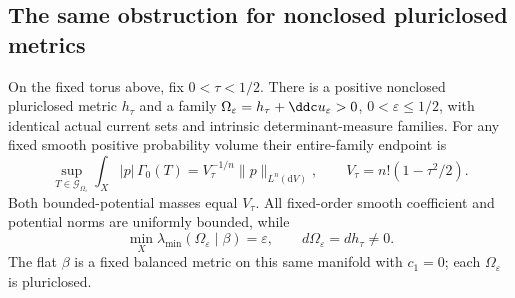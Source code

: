 \subsection{The same obstruction for nonclosed pluriclosed metrics}
\begin{theorem}\label{thm:fixed-determinant-nonclosed-degeneration}
On the fixed torus above, fix $0<\tau<1/2$. There is a positive
nonclosed pluriclosed metric $h_\tau$ and a family
$\Omega_\varepsilon=h_\tau+\ddc u_\varepsilon>0$,
$0<\varepsilon\leq1/2$, with identical actual current sets and
intrinsic determinant-measure families. For any fixed smooth positive
probability volume their entire-family endpoint is
\[
 \sup_{T\in\mathscr G_{\Omega_\varepsilon}}
       \int_X|p|\,\Gamma_0(T)
       =V_\tau^{-1/n}\|p\|_{L^n(\mathrm dV)},\qquad
 V_\tau=n!(1-\tau^2/2).
\]
Both bounded-potential masses equal $V_\tau$. All fixed-order smooth
coefficient and potential norms are uniformly bounded, while
\[
 \min_X\lambda_{\min}(\Omega_\varepsilon\mid\beta)=\varepsilon,
 \qquad d\Omega_\varepsilon=dh_\tau\ne0.
\]
The flat $\beta$ is a fixed balanced metric on this same manifold
with $c_1=0$; each $\Omega_\varepsilon$ is pluriclosed.
\end{theorem}
